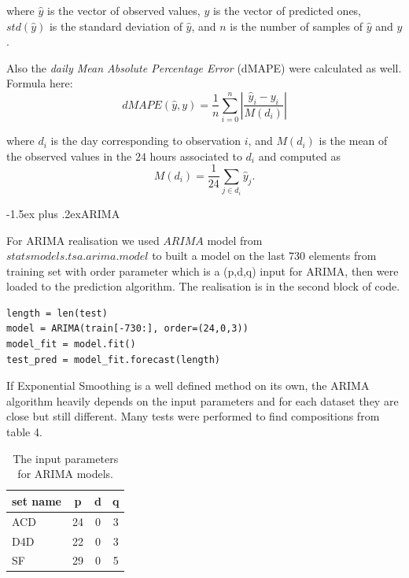 \documentclass[12pt,a4paper]{article}
\makeatletter
\renewcommand{\subsection}{\@startsection{subsection}{2}{18pt}{3.25ex plus 1ex minus 0.2ex}%
{-1.5ex plus .2ex}{\bfseries\rmfamily\large}}
\theoremstyle{myplain}
\numberwithin{equation}{section}
\makeatother
\begin{document}
where $ \widehat{y} $ is the vector of observed values, $ y $ is the vector of predicted ones, $ std(\widehat{y}) $
is the standard deviation of $ \widehat{y} $, and $ n $ is the number of samples of $ \widehat{y} $ and $ y $.

Also the \textit{daily Mean Absolute Percentage Error} (dMAPE) were calculated as well. Formula here:
\begin{equation}
dMAPE(\widehat{y}, y) = \frac{1}{n} \sum_{i = 0}^n \left| \frac{\widehat{y}_i - y_i}{M(d_i)} \right|
\end{equation}

where $ d_i $ is the day corresponding to observation $ i $, and $ M(d_i) $ is the mean of the
observed values in the $ 24 $ hours associated to $ d_i $ and computed as
\begin{equation}
M(d_i) = \frac{1}{24} \sum_{j\in d_i}\widehat{y}_j.
\end{equation}

\subsection{ARIMA}

For ARIMA realisation we used $ARIMA$ model from $statsmodels.tsa.arima.model$ to built a model on the last $730$ elements from training set with order parameter which is a (p,d,q) input for ARIMA, then were loaded to the prediction algorithm. The realisation is in the second block of code.

\begin{lstlisting}
length = len(test)
model = ARIMA(train[-730:], order=(24,0,3))
model_fit = model.fit()
test_pred = model_fit.forecast(length)
\end{lstlisting}

If Exponential Smoothing is a well defined method on its own, the ARIMA algorithm heavily depends on the input parameters and for each dataset they are close but still different. Many tests were performed to find compositions from table 4.
\begin{table}[h!]
\label{tab:table4}
\begin{center}
\begin{tabular}{|l|c|c|c|}
\hline
set name & p & d & q \\
\hline
ACD & 24 & 0 & 3 \\
\hline
D4D & 22 & 0 & 3 \\
\hline
SF & 29 & 0 & 5 \\
\hline
\end{tabular}
\end{center}
\caption{The input parameters for ARIMA models.}
\end{table}
\end{document}

